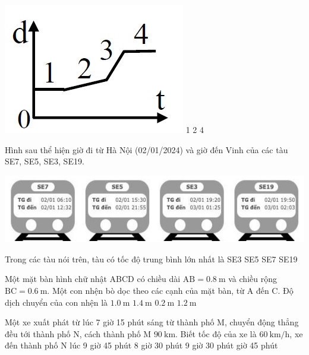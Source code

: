 \begin{ex}
	{\includegraphics[width=0.35\linewidth]{../figs/D10-2-11}}
	\choice
	{1}
	{2}
	{}
	{4}
	\loigiai{}
\end{ex}
\begin{ex}
	Hình sau thể hiện giờ đi từ Hà Nội (02/01/2024) và giờ đến Vinh của các tàu SE7, SE5, SE3, SE19.
	\begin{center}
		\includegraphics[width=0.7\linewidth]{../figs/D10-2-12}
	\end{center}
	Trong các tàu nói trên, tàu có tốc độ trung bình lớn nhất là
	\choice
	{\True SE3}
	{SE5}
	{SE7}
	{SE19}
	\loigiai{}
\end{ex}
\begin{ex}
	Một mặt bàn hình chữ nhật ABCD có chiều dài $\mathrm{AB}=\SI{0.8}{\meter}$ và chiều rộng $\mathrm{BC}=\SI{0.6}{\meter}$. Một con nhện bò dọc theo các cạnh của mặt bàn, từ A đến C. Độ dịch chuyển của con nhện là
	\choice
	{\True $\SI{1.0}{\meter}$}
	{$\SI{1.4}{\meter}$}
	{$\SI{0.2}{\meter}$}
	{$\SI{1.2}{\meter}$}
	\loigiai{}
\end{ex}
\begin{ex}
	Một xe xuất phát từ lúc 7 giờ 15 phút sáng từ thành phố M, chuyển động thẳng đều tới thành phố N, cách thành phố M $\SI{90}{\kilo\meter}$. Biết tốc độ của xe là $\SI{60}{\kilo\meter/\hour}$, xe đến thành phố N lúc	
	\choice
	{9 giờ 45 phút}
	{8 giờ 30 phút}
	{9 giờ 30 phút}
	{ giờ 45 phút}
\end{ex}

